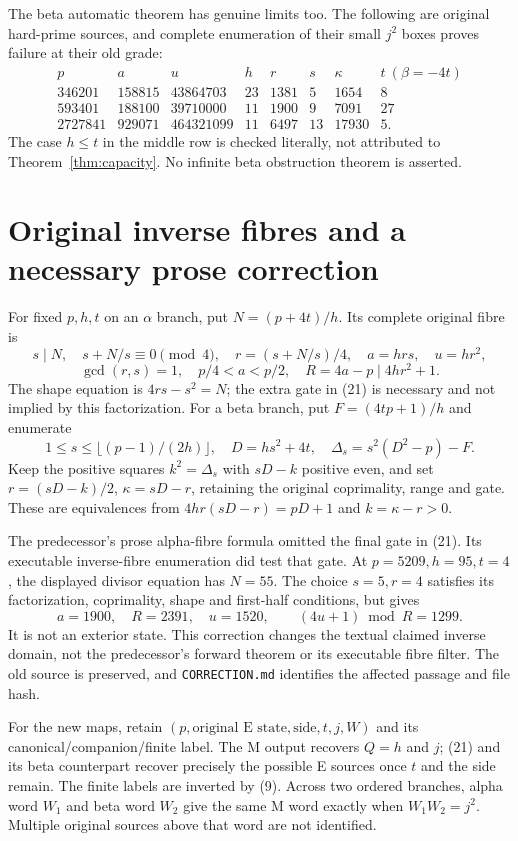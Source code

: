 The beta automatic theorem has genuine limits too. The following are original
hard-prime sources, and complete enumeration of their small $j^2$ boxes proves
failure at their old grade:
\[
\begin{array}{c|r|r|r|r|r|r|r}
 p&a&u&h&r&s&\kappa&t\ (\beta=-4t)\\\hline
346201&158815&43864703&23&1381&5&1654&8\\
593401&188100&39710000&11&1900&9&7091&27\\
2727841&929071&464321099&11&6497&13&17930&5.
\end{array}                                             \tag{20}
\]
The case $h\le t$ in the middle row is checked literally, not attributed to
Theorem~\ref{thm:capacity}. No infinite beta obstruction theorem is asserted.

\section{Original inverse fibres and a necessary prose correction}
For fixed $p,h,t$ on an $\alpha$ branch, put $N=(p+4t)/h$. Its complete original
fibre is
\[
 s\mid N,\quad s+N/s\equiv0\pmod4,\quad r=(s+N/s)/4,
 \quad a=hrs,\quad u=hr^2,
\]
\[
 \boxed{\gcd(r,s)=1,\quad p/4<a<p/2,\quad
        R=4a-p\mid4hr^2+1.}                             \tag{21}
\]
The shape equation is $4rs-s^2=N$; the extra gate in (21) is necessary and not
implied by this factorization. For a beta branch, put $F=(4tp+1)/h$ and enumerate
\[
 1\le s\le\lfloor(p-1)/(2h)\rfloor,\quad
 D=hs^2+4t,\quad\Delta_s=s^2(D^2-p)-F.
\]
Keep the positive squares $k^2=\Delta_s$ with $sD-k$ positive even, and set
$r=(sD-k)/2$, $\kappa=sD-r$, retaining the original coprimality, range and gate.
These are equivalences from $4hr(sD-r)=pD+1$ and $k=\kappa-r>0$.

The predecessor's prose alpha-fibre formula omitted the final gate in (21).
Its executable inverse-fibre enumeration did test that gate. At
$p=5209,h=95,t=4$, the displayed divisor equation has $N=55$. The choice
$s=5,r=4$ satisfies its factorization, coprimality, shape and first-half conditions,
but gives
\[
 a=1900,\quad R=2391,\quad u=1520,\qquad
 (4u+1)\bmod R=1299.
\]
It is not an exterior state. This correction changes the textual claimed inverse
domain, not the predecessor's forward theorem or its executable fibre filter.
The old source is preserved, and \texttt{CORRECTION.md} identifies the affected
passage and file hash.

For the new maps, retain $(p,\text{original E state},\text{side},t,j,W)$ and its
canonical/companion/finite label. The M output recovers $Q=h$ and $j$; (21) and
its beta counterpart recover precisely the possible E sources once $t$ and the
side remain. The finite labels are inverted by (9). Across two ordered branches,
alpha word $W_1$ and beta word $W_2$ give the same M word exactly when
$W_1W_2=j^2$. Multiple original sources above that word are not identified.

